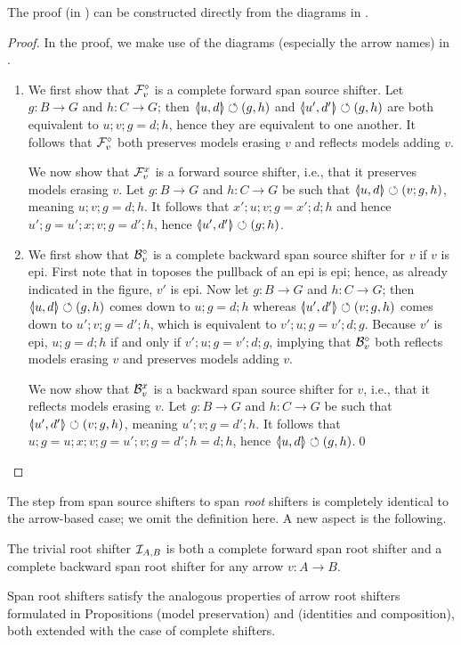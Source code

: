 %
\iffest
The proof (in ) can be constructed directly from the diagrams in .
\fi
\begin{fullorname}
\begin{proof}
In the proof, we make use of the diagrams (especially the arrow names) in .
\begin{enumerate}
\item We first show that $\mathcal{F}_v^\circ$ is a complete forward span source shifter. Let $g:B\to G$ and $h:C\to G$; then $\spanof{u}{d}\commutes (g,h)$ and $\spanof{u'}{d'}\commutes (g,h)$ are both equivalent to $u;v;g=d;h$, hence they are equivalent to one another. It follows that $\mathcal{F}_v^\circ$ both  preserves models erasing $v$ and reflects models adding $v$.

We now show that $\mathcal{F}_v^x$ is a forward source shifter, i.e., that it preserves models erasing $v$. Let $g:B\to G$ and $h:C\to G$ be such that $\spanof{u}{d}\commutes (v;g,h)$, meaning $u;v;g=d;h$. It follows that $x';u;v;g=x';d;h$ and hence $u';g=u';x;v;g=d';h$, hence $\spanof{u'}{d'}\commutes (g;h)$.

\item We first show that $\mathcal{B}_v^\circ$ is a complete backward span source shifter for $v$ if $v$ is epi. First note that in toposes the pullback of an epi is epi; hence, as already indicated in the figure, $v'$ is epi. Now let $g:B\to G$ and $h:C\to G$; then $\spanof{u}{d}\commutes (g,h)$ comes down to $u;g=d;h$ whereas $\spanof{u'}{d'}\commutes (v;g,h)$ comes down to $u';v;g=d';h$, which is equivalent to $v';u;g=v';d;g$. Because $v'$ is epi, $u;g=d;h$ if and only if $v';u;g=v';d;g$, implying that $\mathcal{B}_v^\circ$ both reflects models erasing $v$ and preserves models adding $v$.

We now show that $\mathcal{B}_v^x$ is a backward span source shifter for $v$, i.e., that it reflects models erasing $v$. Let $g:B\to G$ and $h:C\to G$ be such that $\spanof{u'}{d'}\commutes (v;g,h)$, meaning $u';v;g=d';h$. It follows that $u;g=u;x;v;g=u';v;g=d';h=d;h$, hence $\spanof u d\commutes (g,h)$.\qed
\end{enumerate}
\end{proof}
\end{fullorname}
%

\medskip\noindent
The step from span source shifters to span \emph{root} shifters is completely identical to the arrow-based case; we omit the definition here. A new aspect is the following.

\begin{proposition}
The trivial root shifter $\mathcal{I}_{A,B}$ is both a complete forward span root shifter and a complete backward span root shifter for any arrow $v:A\to B$. 
\end{proposition}
%
Span root shifters satisfy the analogous properties of arrow root shifters formulated in Propositions  (model preservation) and  (identities and composition), both extended with the case of complete shifters. 

